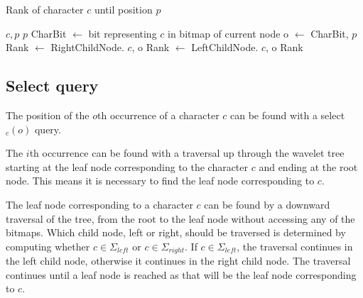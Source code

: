 \begin{algorithm}
\caption{Rank of character $c$ until position $p$}
\label{alg:rank}
\begin{algorithmic} 
 {$c, p$}
\State \Return $p$
\EndIf
\State CharBit $\gets$ bit representing $c$ in bitmap of current node
\State o $\gets$  {CharBit, $p$}
	\State Rank $\gets$ RightChildNode. {$c$, o}
\Else
	\State Rank $\gets$ LeftChildNode. {$c$, o}
\EndIf
\State \Return Rank
\EndFunction
\end{algorithmic}
\end{algorithm}


\subsection{Select query}
\label{sec:selectDescription}
The position of the $o$th occurrence of a character $c$ can be found with a select$_c(o)$ query.

The $i$th occurrence can be found with a traversal up through the wavelet tree starting at the leaf node corresponding to the character $c$ and ending at the root node.
This means it is necessary to find the leaf node corresponding to $c$.

The leaf node corresponding to a character $c$ can be found by a downward traversal of the tree, from the root to the leaf node without accessing any of the bitmaps.
Which child node, left or right, should be traversed is determined by computing whether $c \in \Sigma_{\mathit{left}}$ or $c \in \Sigma_{\mathit{right}}$.
If $c \in \Sigma_{\mathit{left}}$, the traversal continues in the left child node, otherwise it continues in the right child node.
The traversal continues until a leaf node is reached as that will be the leaf node corresponding to $c$.


